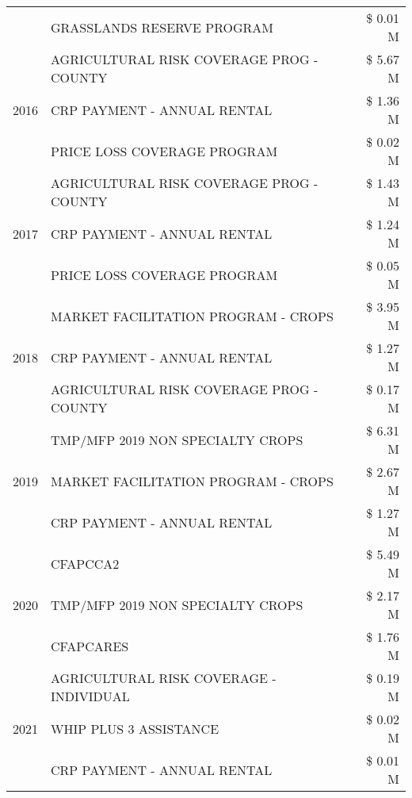 \begin{tabular}{llr}
 & GRASSLANDS RESERVE PROGRAM & \$ 0.01 M \\
\cline{1-3}
\multirow[t]{3}{*}{2016} & AGRICULTURAL RISK COVERAGE PROG - COUNTY      & \$ 5.67 M \\
 & CRP PAYMENT - ANNUAL RENTAL                   & \$ 1.36 M \\
 & PRICE LOSS COVERAGE PROGRAM                   & \$ 0.02 M \\
\cline{1-3}
\multirow[t]{3}{*}{2017} & AGRICULTURAL RISK COVERAGE PROG - COUNTY & \$ 1.43 M \\
 & CRP PAYMENT - ANNUAL RENTAL & \$ 1.24 M \\
 & PRICE LOSS COVERAGE PROGRAM & \$ 0.05 M \\
\cline{1-3}
\multirow[t]{3}{*}{2018} & MARKET FACILITATION PROGRAM - CROPS & \$ 3.95 M \\
 & CRP PAYMENT - ANNUAL RENTAL & \$ 1.27 M \\
 & AGRICULTURAL RISK COVERAGE PROG - COUNTY & \$ 0.17 M \\
\cline{1-3}
\multirow[t]{3}{*}{2019} & TMP/MFP 2019 NON SPECIALTY CROPS & \$ 6.31 M \\
 & MARKET FACILITATION PROGRAM - CROPS & \$ 2.67 M \\
 & CRP PAYMENT - ANNUAL RENTAL & \$ 1.27 M \\
\cline{1-3}
\multirow[t]{3}{*}{2020} & CFAPCCA2 & \$ 5.49 M \\
 & TMP/MFP 2019 NON SPECIALTY CROPS & \$ 2.17 M \\
 & CFAPCARES & \$ 1.76 M \\
\cline{1-3}
\multirow[t]{3}{*}{2021} & AGRICULTURAL RISK COVERAGE - INDIVIDUAL & \$ 0.19 M \\
 & WHIP PLUS 3 ASSISTANCE & \$ 0.02 M \\
 & CRP PAYMENT - ANNUAL RENTAL & \$ 0.01 M \\
\cline{1-3}
\bottomrule
\end{tabular}

